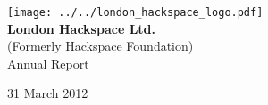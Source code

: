 


\begin{titlepage}
\begin{center}
\texttt{[image: ../../london\_hackspace\_logo.pdf]}\\[48pt]
{\bf \LARGE London Hackspace Ltd.}\\[36pt]
(Formerly Hackspace Foundation) \\[36pt]
{\Large Annual Report}

\vfill
31 March 2012

\end{center}
\end{titlepage}







